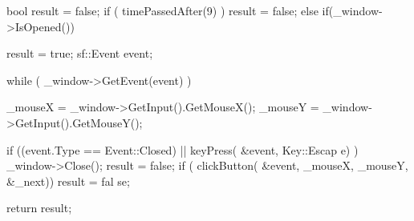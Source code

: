 \begin{DoxyCode}
{
bool result = false;
        if ( timePassedAfter(9) )
        {
                result = false;
        }
        else if(_window->IsOpened())
        {
        result = true;
        sf::Event event;
        
                while ( _window->GetEvent(event) )
                {
                        
                        _mouseX = _window->GetInput().GetMouseX();
                _mouseY = _window->GetInput().GetMouseY();
                        
                if ((event.Type == Event::Closed) || keyPress( &event, Key::Escap
      e) ) 
                        {
                                _window->Close();
                                result = false;
                }
                if ( clickButton( &event, _mouseX, _mouseY, &_next)) result = fal
      se;
                                                                
        }
        }
        return result;
}
\end{DoxyCode}


